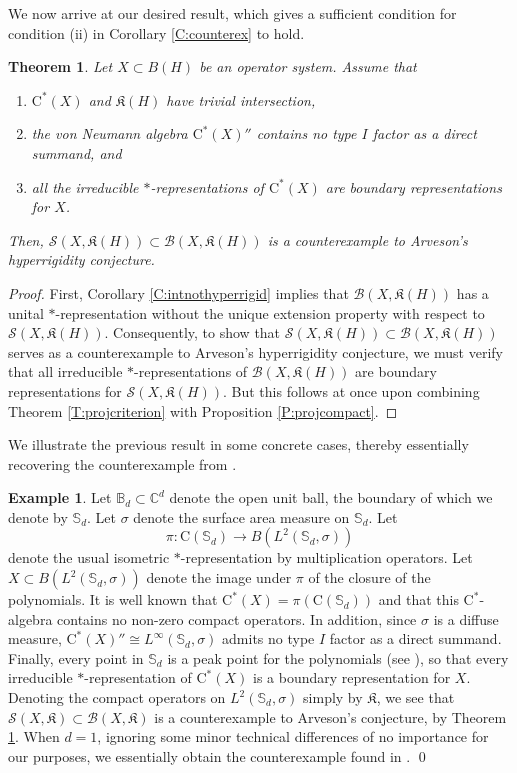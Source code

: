 \documentclass[10pt]{amsart}
\newcommand{\bB}{{\mathbb{B}}}
\newcommand{\bC}{{\mathbb{C}}}
\newcommand{\bS}{{\mathbb{S}}}
\newcommand{\B}{{\mathcal{B}}}
\renewcommand{\S}{{\mathcal{S}}}
\newcommand{\fK}{{\mathfrak{K}}}
\newcommand{\rC}{\mathrm{C}}
\newtheorem{theorem}[lemma]{Theorem}
\theoremstyle{definition}
\newtheorem{example}{Example}
\begin{document}
We now arrive at our desired result, which gives a sufficient condition for condition (ii) in Corollary \ref{C:counterex} to hold.

\begin{theorem}\label{T:counterexK}
Let $X\subset B(H)$ be an operator system. Assume that 
\begin{enumerate}[{\rm (i)}]
\item $\rC^*(X)$ and $\fK(H)$ have trivial intersection,
\item the von Neumann algebra $\rC^*(X)''$ contains no type $I$ factor as a direct summand, and
\item all the irreducible $*$-representations of $\rC^*(X)$ are boundary representations for $X$.
\end{enumerate}
Then, $\S(X,\fK(H))\subset \B(X,\fK(H))$ is a counterexample to Arveson's hyperrigidity conjecture.
\end{theorem}
\begin{proof}
First, Corollary \ref{C:intnothyperrigid} implies that $\B(X,\fK(H))$ has a unital $*$-representation without the unique extension property with respect to $\S(X,\fK(H))$. Consequently,  to show that $\S(X,\fK(H))\subset \B(X,\fK(H))$  serves as a counterexample to   Arveson's hyperrigidity conjecture, we must verify that all irreducible $*$-representations of $\B(X,\fK(H))$ are boundary representations for $\S(X,\fK(H))$. But this follows at once upon combining Theorem \ref{T:projcriterion} with Proposition \ref{P:projcompact}.
\end{proof}


We illustrate the previous result in some concrete cases, thereby essentially recovering the counterexample from \cite{BDO2024}.



\begin{example}\label{E:BDO}
Let $\bB_d\subset\bC^d$ denote the open unit ball, the boundary of which we denote by $\bS_d$. Let $\sigma$ denote the surface area measure on $\bS_d$. Let $$\pi:\rC(\bS_d)\to B(L^2(\bS_d,\sigma))$$ denote the usual isometric $*$-representation by multiplication operators. Let $X\subset B(L^2(\bS_d,\sigma))$ denote the image under $\pi$ of the closure of the polynomials. It is well known that $\rC^*(X)=\pi(\rC(\bS_d))$ and that this $\rC^*$-algebra contains no non-zero compact operators. In addition, since $\sigma$ is a diffuse measure, $\rC^*(X)''\cong L^\infty(\bS_d,\sigma)$ admits no type $I$ factor as a direct summand. Finally, every point in $\bS_d$ is a peak point for the polynomials (see \cite[Paragraph 10.2.3]{rudin2008}), so that every irreducible $*$-representation of $\rC^*(X)$ is a boundary representation for $X$.  Denoting the compact operators on $L^2(\bS_d,\sigma)$ simply by $\fK$, we see that $\S(X,\fK)\subset \B(X,\fK)$ is a counterexample to Arveson's conjecture,  by Theorem \ref{T:counterexK}. When $d=1$,  ignoring some minor technical differences of no importance for our purposes, we essentially obtain the counterexample found in \cite{BDO2024}.
\qed
\end{example}
\end{document}
